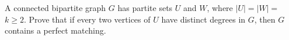 \question A connected bipartite graph \(G\) has partite sets 
\(U\) and \(W\), where \(|U| = |W| = \) \(k \geq 2\). Prove that
if every two vertices of \(U\) have distinct degrees in \(G\),
then \(G\) contains a perfect matching.

\begin{solution}
  
\end{solution}
